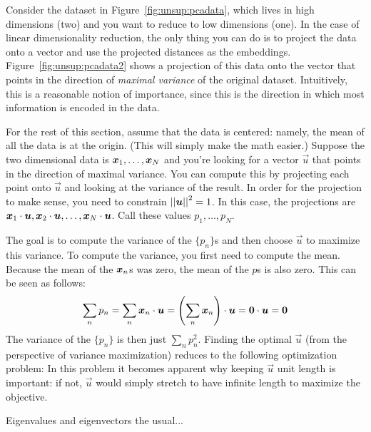 Consider the dataset in Figure~\ref{fig:unsup:pcadata}, which lives in
high dimensions (two) and you want to reduce to low dimensions (one).
In the case of linear dimensionality reduction, the only thing you can
do is to project the data onto a vector and use the projected
distances as the embeddings.  Figure~\ref{fig:unsup:pcadata2} shows a
projection of this data onto the vector that points in the direction
of \emph{maximal variance} of the original dataset.  Intuitively, this
is a reasonable notion of importance, since this is the direction in
which most information is encoded in the data.

For the rest of this section, assume that the data is centered:
namely, the mean of all the data is at the origin.  (This will simply
make the math easier.)  Suppose the two dimensional data is ${\boldsymbol{x}}_1,
\dots, {\boldsymbol{x}}_N$ and you're looking for a vector $\vec u$ that points in
the direction of maximal variance.  You can compute this by projecting
each point onto $\vec u$ and looking at the variance of the result.
In order for the projection to make sense, you need to constrain
$\left\vert\left\vert \boldsymbol{u} \right\vert\right\vert^2 = 1$.  In this case, the projections are
${\boldsymbol{x}}_1 \cdot \boldsymbol{u}, {\boldsymbol{x}}_2 \cdot \boldsymbol{u}, \dots, {\boldsymbol{x}}_N \cdot \boldsymbol{u}$.  Call these values $p_1, \dots, p_N$.

The goal is to compute the variance of the $\{p_n\}$s and then choose
$\vec u$ to maximize this variance.  To compute the variance, you
first need to compute the mean.  Because the mean of the ${\boldsymbol{x}}_n$s was
zero, the mean of the $p$s is also zero.  This can be seen as follows:
%
\begin{align}
  \sum_n p_n
  = \sum_n {\boldsymbol{x}}_n \cdot \boldsymbol{u} 
  = \left( \sum_n {\boldsymbol{x}}_n \right) \cdot \boldsymbol{u} 
  = \boldsymbol{0} \cdot \boldsymbol{u} = \boldsymbol{0}
\end{align}
%
The variance of the $\{p_n\}$ is then just $\sum_n p_n^2$.  Finding
the optimal $\vec u$ (from the perspective of variance maximization)
reduces to the following optimization problem:
%
%
In this problem it becomes apparent why keeping $\vec u$ unit length
is important: if not, $\vec u$ would simply stretch to have infinite
length to maximize the objective.

\begin{mathreview}{Eigenvalues and eigenvectors}
  the usual...
\end{mathreview}

